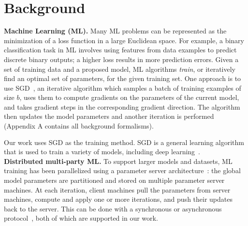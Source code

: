 \chapter{Background}
\label{sec:background}

\noindent \textbf{Machine Learning (ML).} 
%
Many ML problems can be represented as the minimization of a loss
function in a large Euclidean space. For example, a binary
classification task in ML involves using features from data examples to
predict discrete binary outputs; a higher loss results in more
prediction errors. Given a set of training data and a proposed model, ML
algorithms \emph{train}, or iteratively find an optimal set of
parameters, for the given training set. One approach is to use
\ac{SGD}~\cite{Bottou:2010}, an iterative
algorithm which samples a batch of training examples of size $b$, uses
them to compute gradients on the parameters of the current model, and
takes gradient steps in the corresponding gradient direction. The
algorithm then updates the model parameters and another iteration is
performed (Appendix A contains all background formalisms).

Our work uses SGD as the training method. SGD is a
general learning algorithm that is used to train a variety
of models, including deep learning~\cite{Song:2013}.\\

\noindent \textbf{Distributed multi-party ML.}
%
To support larger models and datasets, ML training has been
parallelized using a parameter server architecture~\cite{Li:2014}: the
global model parameters are partitioned and stored on multiple
parameter server machines. At each iteration, client machines pull the 
parameters from server machines, compute and apply one or more
iterations, and push their updates back to the server. This can be
done with a synchronous or asynchronous protocol~\cite{Hsieh:2017,
Recht:2011}, both of which are supported in our work.

